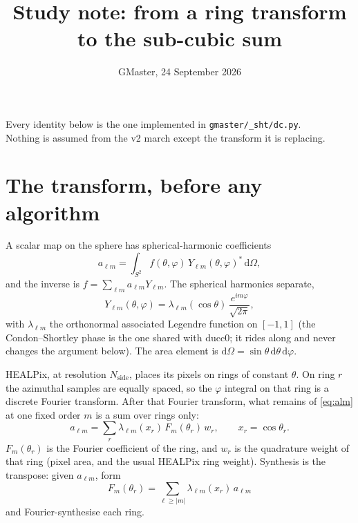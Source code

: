 \documentclass[11pt,a4paper]{article}
\title{\textbf{Study note: from a ring transform to the sub-cubic sum}}
\author{}
\date{GMaster, 24 September 2026}
\numberwithin{equation}{section}
\begin{document}
\maketitle
\vspace{-1.4em}

\begin{center}
{\small Every identity below is the one implemented in \texttt{gmaster/\_sht/dc.py}.\\
Nothing is assumed from the v2 march except the transform it is replacing.}
\end{center}

\tableofcontents

\section{The transform, before any algorithm}
\label{sec:sht}

A scalar map on the sphere has spherical-harmonic coefficients
\begin{equation}
  a_{\ell m}
  = \int_{S^2} f(\theta,\varphi)\, Y_{\ell m}(\theta,\varphi)^\ast \,\mathrm{d}\Omega,
  \label{eq:alm}
\end{equation}
and the inverse is $f=\sum_{\ell m} a_{\ell m} Y_{\ell m}$.
The spherical harmonics separate,
\[
  Y_{\ell m}(\theta,\varphi)
  = \lambda_{\ell m}(\cos\theta)\, \frac{e^{im\varphi}}{\sqrt{2\pi}},
\]
with $\lambda_{\ell m}$ the orthonormal associated Legendre function on $[-1,1]$
(the Condon--Shortley phase is the one shared with ducc0; it rides along and never
changes the argument below). The area element is $\mathrm{d}\Omega=\sin\theta\,\mathrm{d}\theta\,\mathrm{d}\varphi$.

HEALPix, at resolution $N_{\mathrm{side}}$, places its pixels on rings of constant $\theta$.
On ring $r$ the azimuthal samples are equally spaced, so the $\varphi$ integral on that
ring is a discrete Fourier transform. After that Fourier transform, what remains of
\eqref{eq:alm} at one fixed order $m$ is a sum over rings only:
\begin{equation}
  a_{\ell m}
  = \sum_{r} \lambda_{\ell m}(x_r)\, F_m(\theta_r)\, w_r,
  \qquad x_r=\cos\theta_r.
  \label{eq:lat}
\end{equation}
$F_m(\theta_r)$ is the Fourier coefficient of the ring, and $w_r$ is the quadrature
weight of that ring (pixel area, and the usual HEALPix ring weight).
Synthesis is the transpose: given $a_{\ell m}$, form
\begin{equation}
  F_m(\theta_r) = \sum_{\ell\ge |m|} \lambda_{\ell m}(x_r)\, a_{\ell m}
  \label{eq:syn}
\end{equation}
and Fourier-synthesise each ring.
\end{document}
